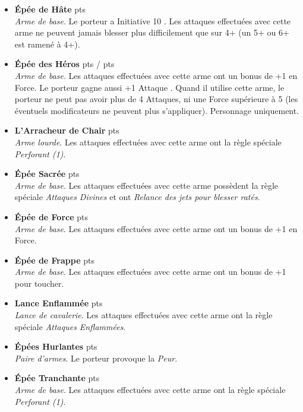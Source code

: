 \begin{multicols}{2}
\begin{itemize}[label={-}]
\item \textbf{Épée de Hâte}  {pts} \\
\textit{Arme de base}. Le porteur a Initiative 10 . Les attaques effectuées avec cette arme ne peuvent jamais blesser plus difficilement que sur 4+ (un 5+ ou 6+ est ramené à 4+).

\item \textbf{Épée des Héros} \dotfill {} {pts} /  {pts} \\
\textit{Arme de base}. Les attaques effectuées avec cette arme ont un bonus de +1 en Force. Le porteur gagne aussi +1 Attaque . Quand il utilise cette arme, le porteur ne peut pas avoir plus de 4 Attaques, ni une Force supérieure à 5 (les éventuels modificateurs ne peuvent plus s'appliquer). Personnage uniquement.

\item \textbf{L'Arracheur de Chair}  {pts} \\
\textit{Arme lourde}. Les attaques effectuées avec cette arme ont la règle spéciale \emph{Perforant (1)}.

\item \textbf{Épée Sacrée}  {pts} \\
\textit{Arme de base}. Les attaques effectuées avec cette arme possèdent la règle spéciale \emph{Attaques Divines} et ont \emph{Relance des jets pour blesser ratés}.

\item \textbf{Épée de Force}  {pts} \\
\textit{Arme de base}. Les attaques effectuées avec cette arme ont un bonus de +1 en Force.

\item \textbf{Épée de Frappe}  {pts} \\
\textit{Arme de base}. Les attaques effectuées avec cette arme ont un bonus de +1 pour toucher.

\item \textbf{Lance Enflammée}  {pts} \\
\textit{Lance de cavalerie}. Les attaques effectuées avec cette arme ont la règle spéciale \emph{Attaques Enflammées}.

\item \textbf{Épées Hurlantes}  {pts} \\
\textit{Paire d'armes}. Le porteur provoque la \emph{Peur}.

\item \textbf{Épée Tranchante}  {pts} \\
\textit{Arme de base}. Les attaques effectuées avec cette arme ont la règle spéciale \emph{Perforant (1)}.

\end{itemize}
\end{multicols}

